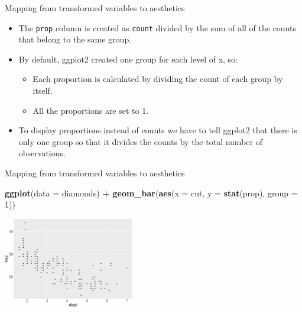 \documentclass[ignorenonframetext,]{beamer}
\newenvironment{Shaded}{\begin{snugshade}}{\end{snugshade}}
\newcommand{\DataTypeTok}[1]{\textcolor[rgb]{0.13,0.29,0.53}{#1}}
\newcommand{\DecValTok}[1]{\textcolor[rgb]{0.00,0.00,0.81}{#1}}
\newcommand{\KeywordTok}[1]{\textcolor[rgb]{0.13,0.29,0.53}{\textbf{#1}}}
\newcommand{\NormalTok}[1]{#1}
\newcommand{\OperatorTok}[1]{\textcolor[rgb]{0.81,0.36,0.00}{\textbf{#1}}}
\newcommand{\StringTok}[1]{\textcolor[rgb]{0.31,0.60,0.02}{#1}}
\providecommand{\tightlist}{%
  \setlength{\itemsep}{0pt}\setlength{\parskip}{0pt}}
\begin{document}
\begin{frame}[fragile]{Mapping from transformed variables to aesthetics}
\protect\hypertarget{mapping-from-transformed-variables-to-aesthetics-3}{}

\begin{itemize}
\item
  The \texttt{prop} column is created as \texttt{count} divided by the
  sum of all of the counts that belong to the same group.
\item
  By default, ggplot2 created one group for each level of x, so:

  \begin{itemize}
  \tightlist
  \item
    Each proportion is calculated by dividing the count of each group by
    itself.
  \item
    All the proportions are set to 1.
  \end{itemize}
\item
  To display proportions instead of counts we have to tell ggplot2 that
  there is only one group so that it divides the counts by the total
  number of observations.
\end{itemize}

\end{frame}

\begin{frame}[fragile]{Mapping from transformed variables to aesthetics}
\protect\hypertarget{mapping-from-transformed-variables-to-aesthetics-4}{}

\begin{Shaded}
\begin{Highlighting}[]
\KeywordTok{ggplot}\NormalTok{(}\DataTypeTok{data =}\NormalTok{ diamonds) }\OperatorTok{+}\StringTok{ }
\StringTok{  }\KeywordTok{geom_bar}\NormalTok{(}\KeywordTok{aes}\NormalTok{(}\DataTypeTok{x =}\NormalTok{ cut, }\DataTypeTok{y =} \KeywordTok{stat}\NormalTok{(prop), }\DataTypeTok{group =} \DecValTok{1}\NormalTok{))}
\end{Highlighting}
\end{Shaded}

\begin{center}\includegraphics[height=150px]{data-visualization_files/figure-beamer/unnamed-chunk-130-1} \end{center}

\end{frame}
\end{document}
